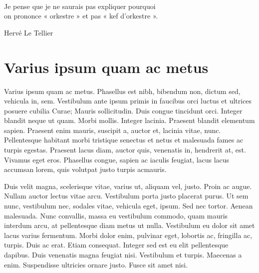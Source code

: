 \documentclass[../hdr.tex]{subfiles}
\begin{document}
\label{chap:super}

\epigraph{\itshape 
  \begin{center}
    {}\\[1ex]
  \end{center}
  \hfill Je pense que je ne saurais pas expliquer pourquoi\\
  \hfill on prononce « orkestre » et pas « kef d'orkestre ».}{Hervé Le Tellier\footnotemark[1]}
\addtocounter{footnote}{1}

\ifSubfilesClassLoaded{%
  \setcounter{secnumdepth}{2}
  \setcounter{tocdepth}{2}
  \tableofcontents
  \begin{center}
  \par\noindent\rule{.4\textwidth}{0.4pt}
  \end{center}
}{%
  \minitoc
}
\vskip2cm


\section{Varius ipsum quam ac metus}

Varius ipsum quam ac metus. Phasellus est nibh, bibendum non, dictum sed,
vehicula in, sem. Vestibulum ante ipsum primis in faucibus orci luctus et
ultrices posuere cubilia Curae; Mauris sollicitudin. Duis congue tincidunt orci.
Integer blandit neque ut quam. Morbi mollis. Integer lacinia. Praesent blandit
elementum sapien. Praesent enim mauris, suscipit a, auctor et, lacinia vitae,
nunc. Pellentesque habitant morbi tristique senectus et netus et malesuada fames
ac turpis egestas. Praesent lacus diam, auctor quis, venenatis in, hendrerit at,
est. Vivamus eget eros. Phasellus congue, sapien ac iaculis feugiat, lacus lacus
accumsan lorem, quis volutpat justo turpis ac\footnotemark mauris.

Duis velit magna, scelerisque vitae, varius ut, aliquam vel, justo. Proin ac
augue. Nullam auctor lectus vitae arcu. Vestibulum porta justo placerat purus.
Ut sem nunc, vestibulum nec, sodales vitae, vehicula eget, ipsum. Sed nec
tortor. Aenean malesuada. Nunc convallis, massa eu vestibulum commodo, quam
mauris interdum arcu, at pellentesque diam metus ut nulla. Vestibulum eu dolor
sit amet lacus varius fermentum. Morbi dolor enim, pulvinar eget, lobortis ac,
fringilla ac, turpis. Duis ac erat. Etiam consequat. Integer sed est eu elit
pellentesque dapibus. Duis venenatis magna feugiat nisi. Vestibulum et turpis.
Maecenas a enim. Suspendisse ultricies ornare justo. Fusce sit amet nisi.
\end{document}
